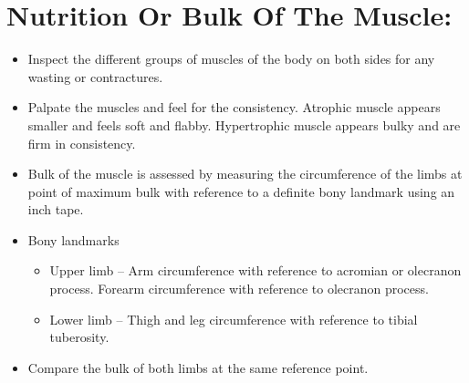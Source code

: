 \documentclass[a4paper,12pt,openany,twoside]{book}
\begin{document}
\section*{Nutrition Or Bulk Of The Muscle:}
\begin{itemize}
		\itemsep0em
\item{Inspect the different groups of muscles of the body on both sides for any wasting or contractures.}
\item{Palpate the muscles and feel for the consistency. Atrophic muscle appears smaller and feels soft and flabby. Hypertrophic muscle appears bulky and are firm in consistency.}
\item{Bulk of the muscle is assessed by measuring the circumference of the limbs at point of maximum bulk with reference to a definite bony landmark using an inch tape.}
\item{Bony landmarks}
	\begin{itemize}
			\itemsep0em
		\item[]Upper limb 	–	Arm circumference with reference to acromian or olecranon 			process. Forearm circumference with reference to olecranon 			process.
		\item[]Lower limb 	–	Thigh and leg circumference with reference to tibial 				tuberosity. 
	\end{itemize}
\item{ Compare the bulk of both limbs at the same reference point.}
\end{itemize}
\end{document}
